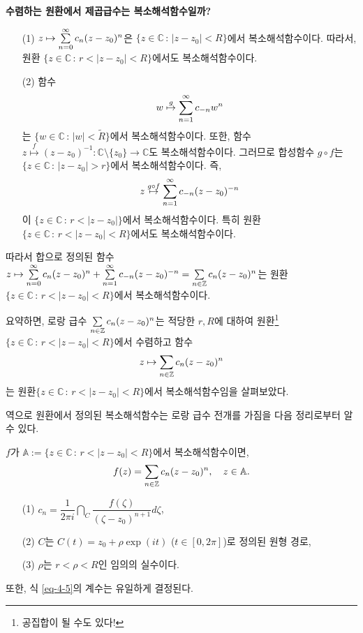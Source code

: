 {\bf  수렴하는 원환에서 제곱급수는 복소해석함수일까?}

\begin{itemize}
\item[(1)] $z\mapsto \sum\limits_{n=0}^\infty c_{n}(z-z_0)^n$은
$\{ z\in\mathbb C\,:\, |z-z_0| <R\}$에서 복소해석함수이다. 따라서,
 원환  $\{ z\in \mathbb C \,:\, r < |z-z_0| <R\}$에서도 복소해석함수이다.
\item[(2)] 함수
\[
w \stackrel{g}{\mapsto} \sum\limits_{n=1}^\infty c_{-n}w^n
\]
는 $\{ w\in\mathbb C\,:\, |w| < \tilde R \}$에서 복소해석함수이다.
또한, 함수 $z \stackrel{f}{\mapsto} (z-z_0)^{-1}: \mathbb C \setminus \{z_0\} \to \mathbb C$도
복소해석함수이다.
그러므로 합성함수 $g\circ f$는 $\{ z\in\mathbb C\,:\, |z-z_0| >r \}$에서
복소해석함수이다. 즉,
\[
z \stackrel{g\circ f}{\mapsto} \sum\limits_{n=1}^\infty c_{-n}(z-z_0)^{-n}
\]
이 $\{ z\in\mathbb C \,:\, r<|z-z_0| \}$에서 복소해석함수이다. 
특히 원환  $\{ z\in \mathbb C \,:\, r < |z-z_0| <R\}$에서도 복소해석함수이다.
\end{itemize}

따라서 합으로 정의된 함수
$z \mapsto \sum\limits_{n=0}^\infty c_n(z-z_0)^n + \sum\limits_{n=1}^\infty c_{-n}(z-z_0)^{-n}
= \sum\limits_{n\in \mathbb Z} c_n(z-z_0)^n$는 
원환
$\{ z\in \mathbb C \,:\, r < |z-z_0| <R\}$에서 복소해석함수이다.

요약하면,
로랑 급수 
$\sum\limits_{n\in \mathbb Z} c_n(z-z_0)^n$는 
적당한 $r, R$에 대하여
원환\footnote{공집합이 될 수도 있다!}
$\{ z\in \mathbb C \,:\, r < |z-z_0| <R\}$에서 수렴하고
함수 
\[
z \mapsto \sum\limits_{n\in \mathbb Z} c_n(z-z_0)^n
\]
는 원환$\{ z\in \mathbb C \,:\, r < |z-z_0| <R\}$에서 
복소해석함수임을 살펴보았다.

역으로 원환에서 정의된 복소해석함수는 로랑 급수 전개를 가짐을 다음 정리로부터 알 수 있다.

\begin{salttheorem}{}{} \label{thm-4-7}
$f$가 $\mathbb A:= \{ z\in \mathbb C \,:\, r < |z-z_0| <R\}$에서 복소해석함수이면,
\begin{equation}\label{eq-4-5}
f(z) = \sum\limits_{n\in \mathbb Z} c_n(z-z_0)^n, \quad z\in\mathbb A.
\end{equation}
\begin{itemize}
\item[(1)] $c_n = \dfrac1{2\pi i} \dint_C \dfrac{f(\zeta)}{(\zeta - z_0)^{n+1}} d\zeta$,
\item[(2)] $C$는 $C(t) = z_0 + \rho \exp(it)$ ($t\in [0,2\pi]$)로 정의된 원형 경로,
\item[(3)] $\rho$는 $r<\rho<R$인 임의의 실수이다.
\end{itemize}
또한, 식 \eqref{eq-4-5}의 계수는 유일하게 결정된다.
\end{salttheorem}

